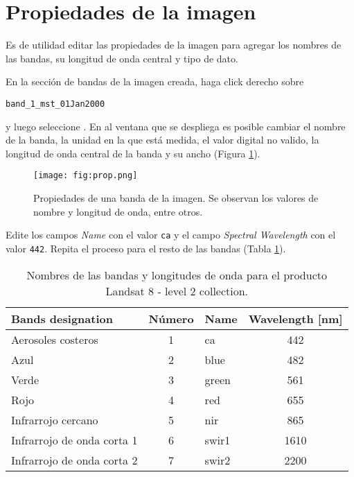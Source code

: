 \section{Propiedades de la imagen}
Es de utilidad editar las propiedades de la imagen para agregar los nombres de las bandas, su longitud de onda central y tipo de dato.

En la sección de bandas de la imagen creada, haga click derecho sobre
\begin{center}
\texttt{band\_1\_mst\_01Jan2000}
\end{center}
y luego seleccione . En al ventana que se despliega es posible cambiar el nombre de la banda, la unidad en la que está medida, el valor digital no valido, la longitud de onda central de la banda y su ancho (Figura \ref{fig:prop}).

\begin{figure}[h!]
    \centering
    \texttt{[image: fig:prop.png]}
    \caption{Propiedades de una banda de la imagen. Se observan los valores de nombre y longitud de onda, entre otros.}
    \label{fig:prop}
\end{figure}

Edite los campos \emph{Name} con el valor \texttt{ca} y el campo \emph{Spectral Wavelength} con el valor \texttt{442}. Repita el proceso para el resto de las bandas (Tabla \ref{tab:landsat8}).

\begin{table}[h!]
  \centering
  \begin{tabular}{@{}lclc@{}}
  \toprule
  Bands designation          & Número & Name  & Wavelength {[}nm{]} \\ \midrule
  Aerosoles costeros         & 1      & ca    & 442                 \\
  Azul                       & 2      & blue  & 482                 \\
  Verde                      & 3      & green & 561                 \\
  Rojo                       & 4      & red   & 655                 \\
  Infrarrojo cercano         & 5      & nir   & 865                 \\
  Infrarrojo de onda corta 1 & 6      & swir1 & 1610                \\
  Infrarrojo de onda corta 2 & 7      & swir2 & 2200                \\ \bottomrule
  \end{tabular}
\caption{Nombres de las bandas y longitudes de onda para el producto Landsat 8 - level 2 collection.}
\label{tab:landsat8}
\end{table}

